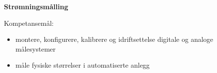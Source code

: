 \centerline{\bf Strømningsmålling}  \bigskip

Kompetansemål:
\begin{itemize}[noitemsep]

	\item montere, konfigurere, kalibrere og idriftsettelse digitale og analoge målesystemer
	\item måle fysiske størrelser i automatiserte anlegg
\end{itemize}
\vskip 2cm
\begin{comment}
\noindent \underbar{Del 1}

\vskip 5pt


\vskip 2pt \noindent {\bf Emne for lekesjonen:} Teknologier for flowmåling

\vskip 2pt \noindent Oppgave 1 - 20; \underbar{besvar oppgave 1-10} som forberedelse til leksjon %

\vskip 10pt

	Læringsmål:
	Målet for leksjonen er å gi en oversikt ovre ulike måleprinsipper som brukes for å måle strømning. 
	\begin{itemize}[noitemsep]
		\item Kunne navngi og beskrive virkemåte for ulike måleelementer som brukes i trykkbaserte strømningsmålere.%
		\item Kunne navngi og beskrive virkemåte for ulike måleprinsipper for hastighetsbaserte strømningsmålere.
		\item Kunne forklare måleprinsippet til en Coriolis strømningsmåler
		\item Kunne forklare måleprinsippet til fortrengingsmålere
		\item Kunne forklare måleprinsippet til termiske strømningsmålere. 
	\end{itemize}


\filbreak
\hrule \vskip 5pt
\noindent \underbar{Del 2}

\vskip 5pt



\end{comment}
